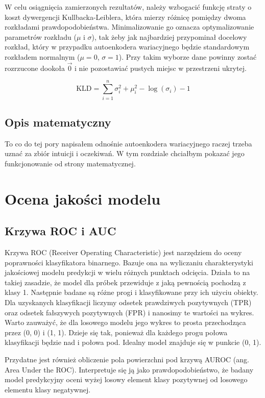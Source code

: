 W celu osiągnięcia zamierzonych rezultatów, należy wzbogacić funkcję straty o koszt dywergencji Kullbacka-Leiblera, która mierzy różnicę pomiędzy dwoma rozkładami prawdopodobieństwa. Minimalizowanie go oznacza optymalizowanie parametrów rozkładu ($\mu$ i $\sigma$), tak żeby jak najbardziej przypominał docelowy rozkład, który w przypadku autoenkodera wariacyjnego będzie standardowym rozkładem normalnym ($\mu = 0$,  $\sigma = 1$).
Przy takim wyborze dane powinny zostać rozrzucone dookoła $\vec{0}$ i nie pozostawiać pustych miejsc w przestrzeni ukrytej.

\begin{equation}
\mathrm { KLD } = \sum _ { i = 1 } ^ { n } \sigma _ { i } ^ { 2 } + \mu _ { i } ^ { 2 } - \log \left( \sigma _ { i } \right) - 1
\end{equation}


\subsection{Opis matematyczny}

To co do tej pory napisałem odnośnie autoenkodera wariacyjnego raczej trzeba uznać za zbiór intuicji i oczekiwań. W tym rozdziale chciałbym pokazać jego funkcjonowanie od strony matematycznej.


\section{Ocena jakości modelu}

\subsection{Krzywa ROC i AUC}

Krzywa ROC (Receiver Operating Characteristic) jest narzędziem do oceny poprawności klasyfikatora binarnego. Bazuje ona na wyliczaniu charakterystyki jakościowej modelu predykcji w wielu różnych punktach odcięcia. Działa to na takiej zasadzie, że model dla próbek przewiduje z jaką pewnością pochodzą z klasy 1. Następnie badane są różne progi i klasyfikowane przy ich użyciu obiekty. Dla uzyskanych klasyfikacji liczymy odsetek prawdziwych pozytywnych (TPR) oraz odsetek fałszywych pozytywnych (FPR) i nanosimy te wartości na wykres. Warto zauważyć, że dla losowego modelu jego wykres to prosta przechodząca przez (0, 0) i (1, 1). Dzieje się tak, ponieważ dla każdego progu połowa klasyfikacji będzie nad i połowa pod. Idealny model znajduje się w punkcie (0, 1).

Przydatne jest również obliczenie pola powierzchni pod krzywą AUROC (ang. Area Under the ROC). Interpretuje się ją jako prawdopodobieństwo, że badany model predykcyjny oceni wyżej losowy element klasy pozytywnej od losowego elementu klasy negatywnej.
